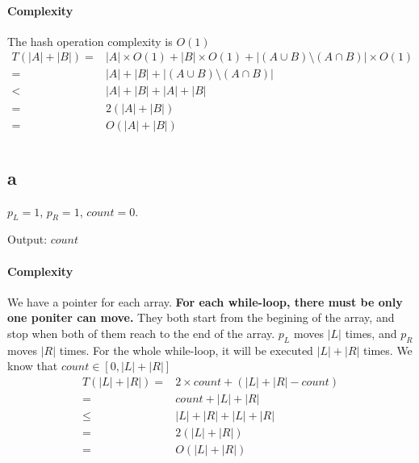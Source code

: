\documentclass{article}
\begin{document}
    \paragraph{Complexity} 
    The hash operation complexity is $O(1)$
    \begin{equation}
        \begin{split}
            T(|A|+|B|)=&|A|\times O(1)+|B|\times O(1)+|(A\cup B) \setminus  (A\cap B)|\times O(1)\\
                        =&|A|+|B|+|(A\cup B) \setminus  (A\cap B)|\\
                        <&|A|+|B|+|A|+|B|\\
                        =&2(|A|+|B|)\\
                        =&O(|A|+|B|)
        \end{split}
    \end{equation}
    \section{}
    \subsection*{a}
    \begin{algorithm}[H]
        \caption{}
        $p_L=1$, $p_R=1$, $count=0$.

        Output: $count$
    \end{algorithm}
    \paragraph{Complexity} We have a pointer for each array. \textbf{For each while-loop, there must be only one poniter can move.} They both start from the begining of the array, and stop when both of them reach to the end of the array. $p_L$ moves $|L|$ times, and $p_R$ moves $|R|$ times. For the whole while-loop, it will be executed $|L|+|R|$ times. We know that $count\in[0,|L|+|R|] $
    \begin{equation}
        \begin{split}
            T(|L|+|R|)=&2\times count +(|L|+|R|-count)\\
                    =&count+|L|+|R|\\
                    \leq& |L|+|R|+|L|+|R|\\
                    =&2(|L|+|R|)\\
                    =&O(|L|+|R|)
        \end{split}
    \end{equation}
\end{document}
